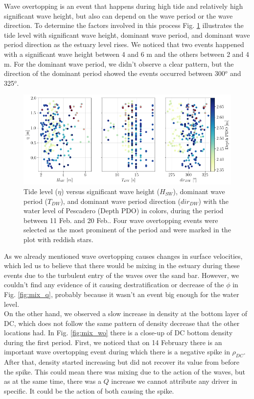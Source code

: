 \documentclass[tesis.tex]{subfiles}
\begin{document}
Wave overtopping is an event that happens during high tide and relatively high significant wave height, but also can depend on the wave period or the wave direction. To determine the factors involved in this process Fig. \ref{fig:WO} illustrates the tide level with significant wave height, dominant wave period, and dominant wave period direction as the estuary level rises. We noticed that two events happened with a significant wave height between 4 and 6 m and the others between 2 and 4 m. For the dominant wave period, we didn't observe a clear pattern, but the direction of the dominant period showed the events occurred between 300$^o$ and 325$^o$. \\

\begin{figure}[h!]
    \centering
    \includegraphics[width=\textwidth]{Imagenes/WO.png}
    \caption{Tide level ($\eta$) versus significant wave height ($H_{SW}$), dominant wave period ($T_{DW}$), and dominant wave period direction ($dir_{DW}$) with the water level of Pescadero (Depth PDO) in colors, during the period between 11 Feb. and 20 Feb.. Four wave overtopping events were selected as the most prominent of the period and were marked in the plot with reddish stars. }
    \label{fig:WO}
\end{figure}

As we already mentioned wave overtopping causes changes in surface velocities, which led us to believe that there would be mixing in the estuary during these events due to the turbulent entry of the waves over the sand bar. However, we couldn't find any evidence of it causing destratification or decrease of the $\phi$ in Fig. \ref{fig:mix_q}, probably because it wasn't an event big enough for the water level. \\

On the other hand, we observed a slow increase in density at the bottom layer of DC, which does not follow the same pattern of density decrease that the other locations had. In Fig. \ref{fig:mix_wo} there is a close-up of DC bottom density during the first period. First, we noticed that on 14 February there is an important wave overtopping event during which there is a negative spike in $\rho_{DC}$. After that, density started increasing but did not recover its value from before the spike. This could mean there was mixing due to the action of the waves, but as at the same time, there was a $Q$ increase we cannot attribute any driver in specific. It could be the action of both causing the spike.\\
\end{document}
